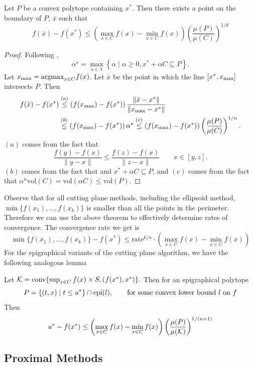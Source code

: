 \begin{lem}\label{lem:lem-voldecrease} Let $P$ be a convex polytope containing $x^*$. Then there exists a point on the boundary of $P$, $\bar{x}$ such that
$$
f(\bar{x})-f(x^{*})\leq\left(\max_{x\in C}f(x)-\min_{x\in C}f(x)\right)\left(\frac{\mu(P)}{\mu(C)}\right)^{1/d}
$$
\end{lem}
\begin{proof}
Following \cite{tarasov1988method},  
$$\alpha^\star = \max_{a\in\lambda}\left\{ \alpha\mid\alpha\geq0,x^*+\alpha C\subseteq P\right\}.$$ 
Let $x_{\max} = \mbox{argmax}_{x\in C} f(x)$. Let $\bar{x}$ be the point in which the line $[x^*, x_{\max} ]$ intersects $P$. Then
\begin{align*}
f(\bar{x})-f(x^{*}) & \overset{(a)}{\leq}\left(f(x_{\max})-f(x^{*})\right)\frac{\|\bar{x}-x^{*}\|}{\|x_{\max}-x^{*}\|}\\
 & \overset{(b)}{\leq}\left(f(x_{\max})-f(x^{*})\right)\alpha^\star
 \overset{(c)}{\leq}\left(f(x_{\max})-f(x^{*})\right)\left(\frac{\mu(P)}{\mu(C)}\right)^{1/n}.
\end{align*}
$(a)$ comes from the fact that $$\frac{f(y)-f(x)}{\|y-x\|}\leq\frac{f(z)-f(x)}{\|z-x\|} \qquad x \in [y,z].$$$(b)$ comes from the fact that and $x^* + \alpha C \subseteq P$, and $(c)$ comes from the fact that $\alpha^n \mbox{vol}(C) =  \mbox{vol}(\alpha C) \leq \mbox{vol}(P).$
\end{proof}
Observe that for all cutting plane methods, including the ellipsoid method, $\min\{f(x_1),\dots, f(x_k)\}$ is smaller than all the points in the perimeter. Therefore we can use the above theorem to effectively determine rates of convergence. The convergence rate we get is
$$
\min\{f(x_{1}),\dots,f(x_{k})\}-f(x^{*})\leq \mbox{rate}^{k/n}\cdot\left(\max_{x\in C}f(x)-\min_{x\in C}f(x)\right)
$$
For the epigraphical variants of the cutting plane algorithm, we have the following analogous lemma

\begin{lem} \label{lem:non_strongly_convex_convergencegen}
Let  $\mathcal{K}=\mbox{{\rm conv}}\{\sup_{x\in C} f(x) \times  S,(f(x^*),x^*)\}.$
Then for an epigraphical polytope $$P =\{(t,x)\mid t\leq u^*\}\cap \mbox{\normalfont epi}(l), \qquad \mbox{for some convex lower bound $l$ on $f$}
$$
Then \[
u^*-f(x^*)\leq \left(\max_{x\in C}f(x)-\min_{x\in C}f(x) \right) \left( \frac{\mu(P)}{\mu(\mathcal{K})} \right)^{1/(n+1)}
\]
\end{lem}

\subsection{Proximal Methods}

